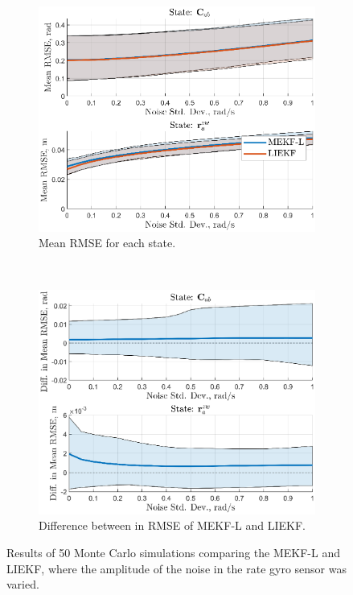 \begin{figure}
	\centering
	\begin{subfigure}[b]{0.5\textwidth}
		\includegraphics[width=\textwidth]{figs/se3/noise_trials/comp_noise_rmse_state_Gyro_L.eps}
		\caption{Mean RMSE for each state.}
		\label{fig:comp_noise_gyro_L_rmse}
	\end{subfigure}
	~
	\begin{subfigure}[b]{0.5\textwidth}
		\includegraphics[width=\textwidth]{figs/se3/noise_trials/comp_noise_diff_state_Gyro_L.eps}
		\caption{Difference between in RMSE of MEKF-L and LIEKF.}
		\label{fig:comp_noise_gyro_L_diff}
	\end{subfigure}
	\caption[Results comparing the MEKF-L and LIEKF varying rate gyro noise.]{Results of 50 Monte Carlo simulations comparing the MEKF-L and LIEKF, where the amplitude of the noise in the rate gyro sensor was varied. }
	\label{fig:comp_noise_gyro_L}
\end{figure}


